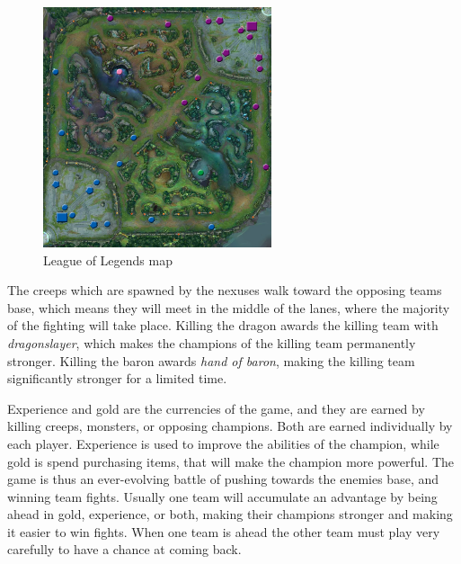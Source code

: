\begin{figure}[!htb]
  \centering
    \includegraphics[width=0.6\textwidth]{img/lolmap.jpg}
  \caption{League of Legends map~\cite{lolmap}}\label{fig:lolmap}
\end{figure}

The creeps which are spawned by the nexuses walk toward the opposing teams base, which means they will meet in the middle of the lanes, where the majority of the fighting will take place. Killing the dragon awards the killing team with \emph{dragonslayer}, which makes the champions of the killing team permanently stronger. Killing the baron awards \emph{hand of baron}, making the killing team significantly stronger for a limited time.

Experience and gold are the currencies of the game, and they are earned by killing creeps, monsters, or opposing champions. Both are earned individually by each player. Experience is used to improve the abilities of the champion, while gold is spend purchasing items, that will make the champion more powerful. The game is thus an ever-evolving battle of pushing towards the enemies base, and winning team fights. Usually one team will accumulate an advantage by being ahead in gold, experience, or both, making their champions stronger and making it easier to win fights. When one team is ahead the other team must play very carefully to have a chance at coming back. 

